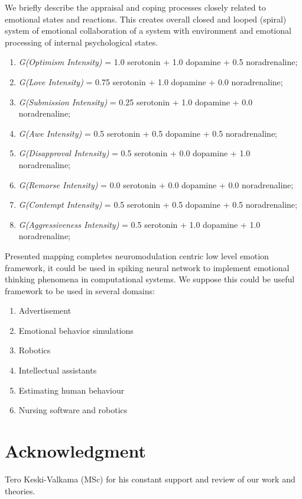 We briefly describe the appraisal and coping processes closely related to emotional states and reactions. This creates overall closed and looped (spiral) system of emotional collaboration of a system with environment and emotional processing of internal psychological states.



\begin{enumerate}
 \item  \emph{G(Optimism Intensity)} = 1.0 serotonin  + 1.0 dopamine + 0.5 noradrenaline;
 \item  \emph{G(Love Intensity)} = 0.75 serotonin + 1.0 dopamine + 0.0 noradrenaline;
 \item  \emph{G(Submission Intensity)} = 0.25 serotonin + 1.0 dopamine + 0.0 noradrenaline;
 \item  \emph{G(Awe Intensity)} = 0.5 serotonin + 0.5 dopamine + 0.5 noradrenaline;
 \item  \emph{G(Disapproval Intensity)} = 0.5 serotonin + 0.0 dopamine + 1.0 noradrenaline;
 \item  \emph{G(Remorse Intensity)} = 0.0 serotonin + 0.0 dopamine + 0.0 noradrenaline;
 \item  \emph{G(Contempt Intensity)} = 0.5 serotonin + 0.5 dopamine + 0.5 noradrenaline;
 \item  \emph{G(Aggressiveness Intensity)} = 0.5 serotonin + 1.0 dopamine + 1.0 noradrenaline;
\end{enumerate}

Presented mapping completes neuromodulation centric low level emotion framework, it could be used in spiking neural network to implement emotional thinking phenomena in computational systems. We suppose this could be useful framework to be used in several domains:

\begin{enumerate}
 \item  Advertisement
 \item  Emotional behavior simulations
 \item  Robotics
 \item  Intellectual assistants
 \item  Estimating human behaviour
 \item  Nursing software and robotics
\end{enumerate}

\section{Acknowledgment}

Tero Keski-Valkama (MSc) for his constant support and review of our work and theories.
